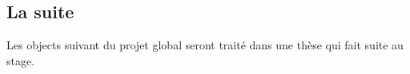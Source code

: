 
\subsection{La suite}

Les objects suivant du projet global seront traité dans une thèse qui fait suite au stage.
